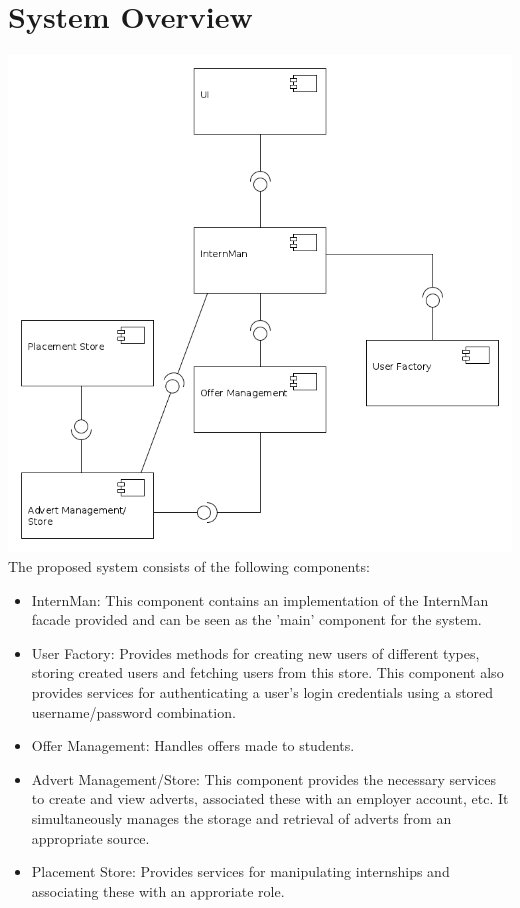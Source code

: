 \documentclass{l3deliverable}
\begin{document}
\section{System Overview}
\includegraphics[scale = 0.4]{ComponentDiagram.png}\\
The proposed system consists of the following components:
\begin{itemize}
\item{InternMan: This component contains an implementation of the InternMan facade provided and can be seen as the 'main' component for the system. }
\item{User Factory: Provides methods for creating new users of different types, storing created users and fetching users from this store. This component also provides
services for authenticating a user's login credentials using a stored username/password combination.}
\item{Offer Management: Handles offers made to students.}
\item{Advert Management/Store: This component provides the necessary services to create and view adverts, associated these with an employer account, etc. It simultaneously
manages the storage and retrieval of adverts from an appropriate source.}
\item{Placement Store: Provides services for manipulating internships and associating these with an approriate role.}
\end{itemize}
\end{document}

